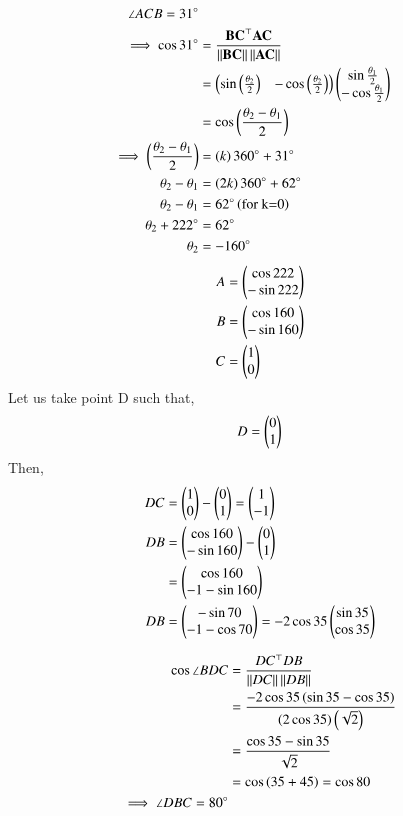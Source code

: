 \documentclass[journal,12pt,twocolumn]{IEEEtran}
\begin{document}
\begin{enumerate}
		\begin{align}
			\angle ACB = 31 \degree \\
			\implies \cos 31 \degree &=  \frac{\mathbf{BC}^{\top}\mathbf{AC}}{\left\lVert\mathbf{BC}\right\rVert\left\lVert\mathbf{AC}\right\rVert}\\ 
						 &= \begin{pmatrix}\sin \left(\frac{\theta_2}{2}\right)&-\cos \left(\frac{\theta_2}{2}\right)\end{pmatrix}\begin{pmatrix}\sin \frac{\theta_1}{2} \\ -\cos \frac{\theta_1}{2}\end{pmatrix}\\
						 &= \cos \left(\frac{\theta_2-\theta_1}{2}\right)\\
			\implies \left(\frac{\theta_2-\theta_1}{2}\right) &= \left(k\right)360\degree +31\degree\\
			       \theta_2-\theta_1 &= \left(2k\right)360\degree + 62\degree\\ 
			       \theta_2-\theta_1 &= 62\degree \left(\text{for k=0}\right)\\
			       \theta_2+222\degree &= 62\degree\\
			       \theta_2 &= -160\degree 
		\end{align}
		\begin{align}
			A &= \begin{pmatrix}\cos 222\\ -\sin 222\end{pmatrix}\\
			B &= \begin{pmatrix}\cos 160\\ -\sin 160\end{pmatrix}\\
			C &= \begin{pmatrix}1\\0\end{pmatrix}
		\end{align}
		Let us take point D such that,
		\begin{align}
			D = \begin{pmatrix}0\\1\end{pmatrix}
		\end{align}
		Then,
		\begin{align}
			DC &= \begin{pmatrix}1\\0\end{pmatrix}-\begin{pmatrix}0\\1\end{pmatrix} = \begin{pmatrix}1\\-1\end{pmatrix}\\
			DB &= \begin{pmatrix}\cos 160\\ -\sin 160\end{pmatrix} - \begin{pmatrix}0\\1\end{pmatrix}\\
			   &= \begin{pmatrix}\cos 160\\ -1-\sin 160\end{pmatrix}\\
			DB &= \begin{pmatrix}-\sin 70\\ -1-\cos 70\end{pmatrix} = -2\cos 35 \begin{pmatrix}\sin 35\\ \cos35\end{pmatrix}\\
		\end{align}
	
		\begin{align}
			\cos \angle BDC &= \frac{DC^{\top}DB}{\left\lVert DC\right\rVert\left\lVert DB\right\rVert}\\
					&= \frac{-2\cos 35 \left(\sin 35 - \cos 35\right)}{\left(2\cos 35\right)\left(\sqrt{2}\right)}\\
					&= \frac{\cos 35 - \sin 35}{\sqrt{2}}\\
					&= \cos \left(35+45\right) = \cos 80\\
			\implies \angle DBC = 80 \degree
		\end{align}

\end{enumerate}
\end{document}
